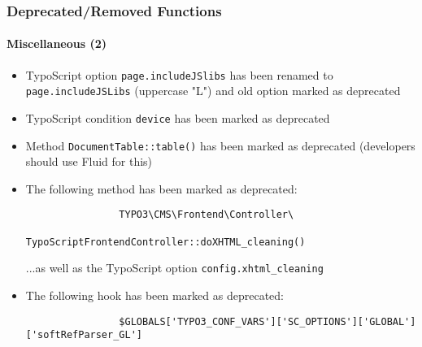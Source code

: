 \begin{frame}[fragile]
	\frametitle{Deprecated/Removed Functions}
	\framesubtitle{Miscellaneous (2)}

	\begin{itemize}
		\item TypoScript option \texttt{page.includeJSlibs} has been renamed to\newline
			\texttt{page.includeJSLibs} (uppercase "L") and old option marked as deprecated

		\item TypoScript condition \texttt{device} has been marked as deprecated

		\item Method \texttt{DocumentTable::table()} has been marked as deprecated\newline
			\small(developers should use Fluid for this)\normalsize

		\item The following method has been marked as deprecated:
			\begin{lstlisting}
				TYPO3\CMS\Frontend\Controller\
				    TypoScriptFrontendController::doXHTML_cleaning()
			\end{lstlisting}
			...as well as the TypoScript option
			\small
				\texttt{config.xhtml\_cleaning}
			\normalsize

		\item The following hook has been marked as deprecated:
			\begin{lstlisting}
				$GLOBALS['TYPO3_CONF_VARS']['SC_OPTIONS']['GLOBAL']['softRefParser_GL']
			\end{lstlisting}

	\end{itemize}

\end{frame}


